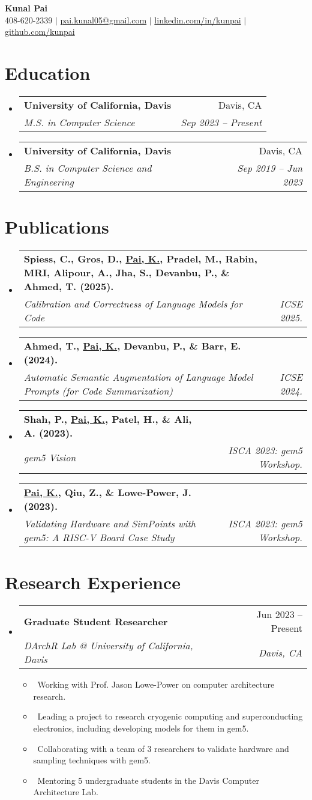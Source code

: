 \documentclass[letterpaper,10pt]{article}
\makeatletter
\newcommand{\resumeItem}[1]{\item\small{#1}}
\newcommand{\resumeSubheading}[4]{
\vspace{-1pt}\item
  \begin{tabular*}{0.97\textwidth}[t]{l@{\extracolsep{\fill}}r}
    \textbf{#1} & #2 \\
    \textit{#3} & \textit{#4} \\
  \end{tabular*}\vspace{-7pt}
}
\newcommand{\resumeSubHeadingList}{\begin{itemize}[leftmargin=0.15in, label={}]}
\newcommand{\resumeSubHeadingListEnd}{\end{itemize}}
\makeatother
\begin{document}
\begin{center}
  \textbf{\Huge Kunal Pai} \\
  \small 408-620-2339 $|$ \href{mailto:pai.kunal05@gmail.com}{pai.kunal05@gmail.com} $|$ 
  \href{https://linkedin.com/in/kunpai}{linkedin.com/in/kunpai} $|$
  \href{https://github.com/kunpai}{github.com/kunpai}
\end{center}

\section{Education}
\resumeSubHeadingList
  \resumeSubheading
      {University of California, Davis}{Davis, CA}
      {M.S. in Computer Science}{Sep 2023 -- Present}
  \resumeSubheading
      {University of California, Davis}{Davis, CA}
      {B.S. in Computer Science and Engineering}{Sep 2019 -- Jun 2023}
\resumeSubHeadingListEnd

\section{Publications}
\resumeSubHeadingList
\resumeSubheading
      {Spiess, C., Gros, D., \underline{Pai, K.}, Pradel, M., Rabin, MRI, Alipour, A., Jha, S., Devanbu, P., \& Ahmed, T. (2025).}{}
      {Calibration and Correctness of Language Models for Code}{ICSE 2025.}
  \resumeSubheading
      {Ahmed, T., \underline{Pai, K.}, Devanbu, P., \& Barr, E. (2024).}{}
      {Automatic Semantic Augmentation of Language Model Prompts (for Code Summarization)}{ICSE 2024.}
  \resumeSubheading
      {Shah, P., \underline{Pai, K.}, Patel, H., \& Ali, A. (2023).}{}
      {gem5 Vision}{ISCA 2023: gem5 Workshop.}
  \resumeSubheading
      {\underline{Pai, K.}, Qiu, Z., \& Lowe-Power, J. (2023).}{}
      {Validating Hardware and SimPoints with gem5: A RISC-V Board Case Study}{ISCA 2023: gem5 Workshop.}
\resumeSubHeadingListEnd

\section{Research Experience}
\resumeSubHeadingList
  \resumeSubheading
      {Graduate Student Researcher}{Jun 2023 -- Present}
      {DArchR Lab @ University of California, Davis}{Davis, CA}
      \resumeSubHeadingList
          \resumeItem{\textbullet\ Working with Prof. Jason Lowe-Power on computer architecture research.}
          \resumeItem{\textbullet\ Leading a project to research cryogenic computing and superconducting electronics, including developing models for them in gem5.}
          \resumeItem{\textbullet\ Collaborating with a team of 3 researchers to validate hardware and sampling techniques with gem5.}
          \resumeItem{\textbullet\ Mentoring 5 undergraduate students in the Davis Computer Architecture Lab.}
      \resumeSubHeadingListEnd
\resumeSubHeadingListEnd
\end{document}
